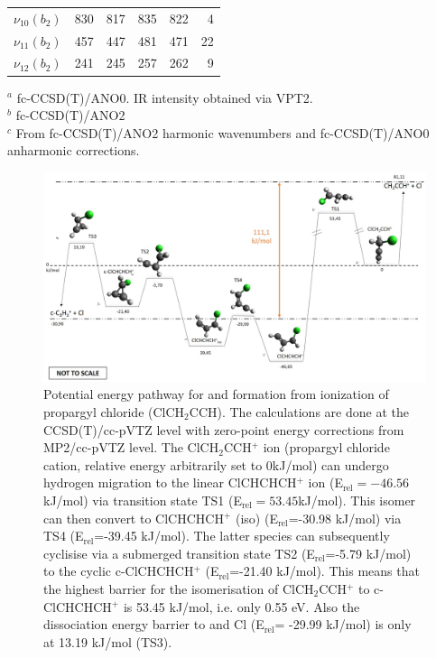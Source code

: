 \begin{table}[ht]
\begin{center}
\begin{tabular}{rrrrrr}
        $\nu_{10}(b_2)$&  830 &  817 &  835 &  822 &   4  \\ %
        $\nu_{11}(b_2)$&  457 &  447 &  481 &  471 &  22  \\ %
        $\nu_{12}(b_2)$&  241 &  245 &  257 &  262 &   9  \\ %
        \bottomrule
        \hline
    \end{tabular}
    \end{center}
    $^a$ fc-CCSD(T)/ANO0. IR intensity obtained via VPT2.\\
    $^b$ fc-CCSD(T)/ANO2\\
    $^c$ From fc-CCSD(T)/ANO2 harmonic wavenumbers and fc-CCSD(T)/ANO0 anharmonic corrections.

\end{table}

\begin{figure}[!ht]
	
	\centering
	\includegraphics[width=1\textwidth]{chapters/C3H3+ and C3D3+/figures/energy_calculation.jpg}

	\caption{
        Potential energy pathway for \cyc and \lin formation from ionization of propargyl chloride (ClCH$_2$CCH). 
        The calculations are done at the CCSD(T)/cc-pVTZ level with zero-point energy corrections from MP2/cc-pVTZ level.
        The ClCH$_2$CCH$^+$ ion (propargyl chloride cation, 
        relative energy arbitrarily set  to $0$kJ/mol) can undergo hydrogen migration to the linear 
        ClCHCHCH$^+$ ion (E$_ \text{rel}=-46.56$kJ/mol) 
        via transition state TS1 (E$_\text{rel}=53.45$kJ/mol).
        This isomer can then convert to ClCHCHCH$^+$ (iso) (E$_\text{rel}$=-30.98 kJ/mol) via TS4 (E$_\text{rel}$=-39.45 kJ/mol). 
        The latter species can subsequently cyclisise via a submerged transition state TS2 (E$_\text{rel}$=-5.79 kJ/mol) to the cyclic c-ClCHCHCH$^+$ (E$_\text{rel}$=-21.40 kJ/mol).
        This means that the highest barrier for the isomerisation of ClCH$_2$CCH$^+$ to c-ClCHCHCH$^+$ is 53.45 kJ/mol, i.e. only 0.55 eV. 
        Also the dissociation energy barrier to \cyc and Cl (E$_\text{rel}$= -29.99 kJ/mol) is only at 13.19 kJ/mol (TS3).
    }\label{fig:C3H3+:fig1}
	\label{FIG:energy_comparison}
\end{figure}
